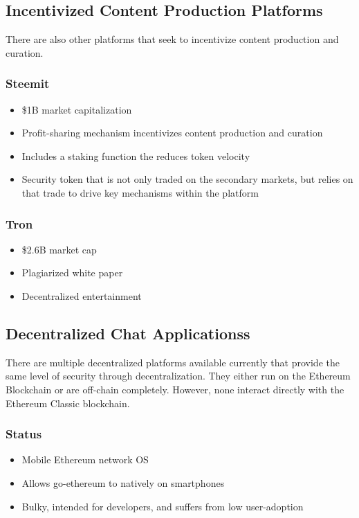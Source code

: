 \documentclass[11pt]{report}
\begin{document}
\subsection{Incentivized Content Production Platforms}
There are also other platforms that seek to incentivize content production and curation.
\subsubsection{Steemit\cite{steemit}}
\begin{itemize}
\item \$1B market capitalization
\item Profit-sharing mechanism incentivizes content production and curation
\item Includes a staking function the reduces token velocity
\item Security token that is not only traded on the secondary markets, but relies on that trade to drive key mechanisms within the platform
\end{itemize}
\subsubsection{Tron\cite{tron}}
\begin{itemize}
\item \$2.6B market cap
\item Plagiarized\cite{tron-plagiarized} white paper
\item Decentralized entertainment 
\end{itemize}
\subsection{Decentralized Chat Applicationss}
There are multiple decentralized platforms available currently that provide the same level of security through decentralization. They either run on the Ethereum Blockchain or are off-chain completely. However, none interact directly with the Ethereum Classic blockchain.
\subsubsection{Status\cite{status}}
\begin{itemize}
\item Mobile Ethereum network OS
\item Allows go-ethereum to natively on smartphones
\item Bulky, intended for developers, and suffers from low user-adoption
\end{itemize}
\end{document}
